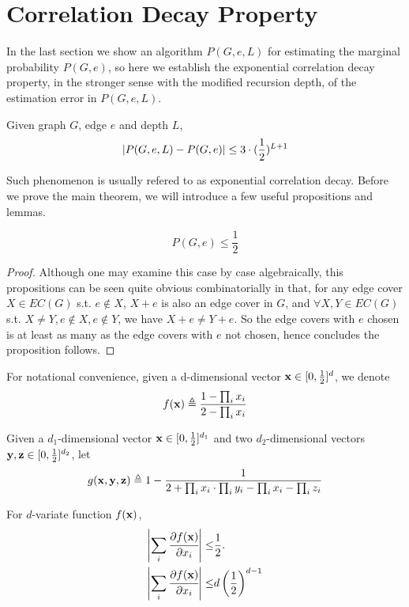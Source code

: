 \section{Correlation Decay Property}

In the last section we show an algorithm $P(G,e,L)$ for estimating the marginal probability $P(G,e)$,
so here we establish the exponential correlation decay property, in the stronger sense with the modified recursion depth, %
of the estimation error in $P(G,e,L)$.%

\begin{Thm}
	Given graph $G$, edge $e$ and depth $L$,
	\[\left\vert P(G,e,L) - P(G,e)\right\vert \leq 3\cdot(\frac{1}{2})^{L+1}\]
\end{Thm}

Such phenomenon is usually refered to as exponential correlation decay. Before we prove the main theorem, we will introduce a few useful propositions and lemmas.

\begin{Prop}
	\[P(G, e) \leq \frac{1}{2}\]
\end{Prop}

\begin{proof}
	Although one may examine this case by case algebraically, this propositions can be seen quite obvious combinatorially in that, for any edge cover $X \in EC(G)$ s.t. $e \notin X$, $X+e$ is also an edge cover in $G$, and $\forall X,Y \in EC(G)$ s.t. $X \neq Y, e \notin X, e\notin Y$, we have $X+e \neq Y+e$. So the edge covers with $e$ chosen is at least as many as the edge covers with $e$ not chosen, hence concludes the proposition follows.
\end{proof}

For notational convenience, given a d-dimensional vector ${\bf x} \in [0, \frac{1}{2}]^d$, we denote
\[ f({\bf x}) \triangleq \frac{1- \prod_i x_i}{2 - \prod_i x_i}\]

Given a $d_1$-dimensional vector ${\bf x} \in [0, \frac{1}{2}]^{d_1}$ and two $d_2$-dimensional vectors ${\bf y,z} \in [0, \frac{1}{2}]^{d_2}$, let
\[ g({\bf x,y,z}) \triangleq  1- \frac{1}{2+\prod_i x_i \cdot \prod_i y_i - \prod_i x_i - \prod_i z_i} \]


	\begin{Lem}
		For $d$-variate function $f({\bf x})$,
		\begin{align*}
			\left\vert\sum_i \cfrac{\partial f({\bf x})}{\partial x_i}\right\vert \leq & \frac{1}{2}. \\
			\left\vert\sum_i \cfrac{\partial f({\bf x})}{\partial x_i}\right\vert \leq & d \left( \frac{1}{2} \right)^{d-1}
		\end{align*}
	\end{Lem}

